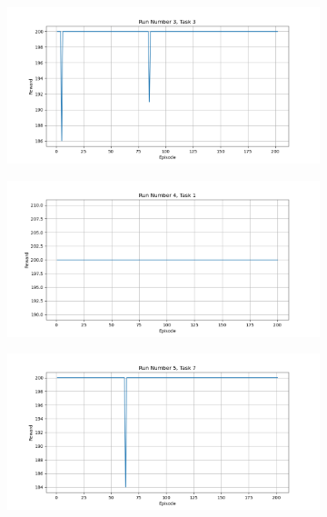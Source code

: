 \documentclass[runningheads]{llncs}
\begin{document}
\begin{figure}[H]
\begin{subfigure}{.45\textwidth}
  \end{subfigure}
   \begin{subfigure}{.45\textwidth}
       \centering
       \includegraphics[width=1\textwidth] {imgs/1000_episodes/Task_3_run_3}
   \end{subfigure}
    \begin{subfigure}{.45\textwidth}
        \centering
        \includegraphics[width=1\textwidth] {imgs/1000_episodes/Task_1_run_4}
    \end{subfigure}
     \begin{subfigure}{.45\textwidth}
         \centering
         \includegraphics[width=1\textwidth] {imgs/1000_episodes/Task_7_run_5}

\end{subfigure}
\end{figure}
\end{document}
